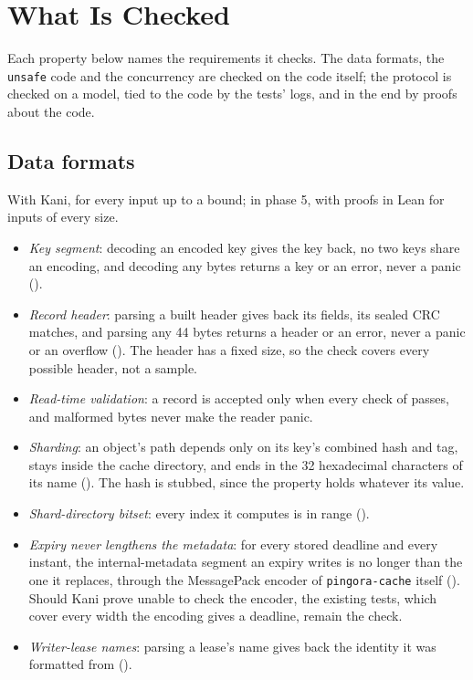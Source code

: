 \section{What Is Checked}
\label{app:verification-properties}

Each property below names the requirements it checks. The data formats, the
\texttt{unsafe} code and the concurrency are checked on the code itself; the
protocol is checked on a model, tied to the code by the tests' logs, and in
the end by proofs about the code.

\subsection{Data formats}

With Kani, for every input up to a bound; in phase 5, with proofs in Lean
for inputs of every size.
\begin{itemize}
  \item \emph{Key segment}: decoding an encoded key gives the key back, no
    two keys share an encoding, and decoding any bytes returns a key or an
    error, never a panic ().
  \item \emph{Record header}: parsing a built header gives back its fields,
    its sealed CRC matches, and parsing any 44 bytes returns a header or an
    error, never a panic or an overflow ().
    The header has a fixed size, so the check covers every possible header,
    not a sample.
  \item \emph{Read-time validation}: a record is accepted only when every
    check of  passes, and malformed bytes
    never make the reader panic.
  \item \emph{Sharding}: an object's path depends only on its key's combined
    hash and tag, stays inside the cache directory, and ends in the 32
    hexadecimal characters of its name (). The
    hash is stubbed, since the property holds whatever its value.
  \item \emph{Shard-directory bitset}: every index it computes is in range
    ().
  \item \emph{Expiry never lengthens the metadata}: for every stored deadline
    and every instant, the internal-metadata segment an expiry writes is no
    longer than the one it replaces, through the MessagePack encoder of
    \texttt{pingora-cache} itself (). Should
    Kani prove unable to check the encoder, the existing tests, which cover every
    width the encoding gives a deadline, remain the check.
  \item \emph{Writer-lease names}: parsing a lease's name gives back the
    identity it was formatted from ().
\end{itemize}

